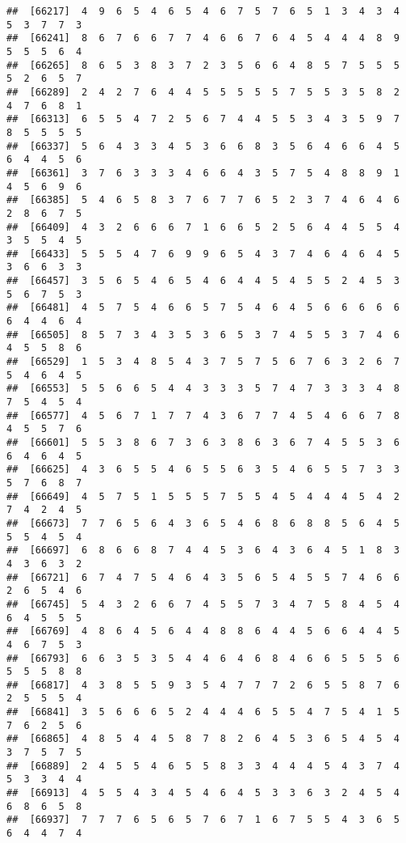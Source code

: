 \documentclass[
]{book}
\begin{document}
\begin{verbatim}
##  [66217]  4  9  6  5  4  6  5  4  6  7  5  7  6  5  1  3  4  3  4  5  3  7  7  3
##  [66241]  8  6  7  6  6  7  7  4  6  6  7  6  4  5  4  4  4  8  9  5  5  5  6  4
##  [66265]  8  6  5  3  8  3  7  2  3  5  6  6  4  8  5  7  5  5  5  5  2  6  5  7
##  [66289]  2  4  2  7  6  4  4  5  5  5  5  5  7  5  5  3  5  8  2  4  7  6  8  1
##  [66313]  6  5  5  4  7  2  5  6  7  4  4  5  5  3  4  3  5  9  7  8  5  5  5  5
##  [66337]  5  6  4  3  3  4  5  3  6  6  8  3  5  6  4  6  6  4  5  6  4  4  5  6
##  [66361]  3  7  6  3  3  3  4  6  6  4  3  5  7  5  4  8  8  9  1  4  5  6  9  6
##  [66385]  5  4  6  5  8  3  7  6  7  7  6  5  2  3  7  4  6  4  6  2  8  6  7  5
##  [66409]  4  3  2  6  6  6  7  1  6  6  5  2  5  6  4  4  5  5  4  3  5  5  4  5
##  [66433]  5  5  5  4  7  6  9  9  6  5  4  3  7  4  6  4  6  4  5  3  6  6  3  3
##  [66457]  3  5  6  5  4  6  5  4  6  4  4  5  4  5  5  2  4  5  3  5  6  7  5  3
##  [66481]  4  5  7  5  4  6  6  5  7  5  4  6  4  5  6  6  6  6  6  6  4  4  6  4
##  [66505]  8  5  7  3  4  3  5  3  6  5  3  7  4  5  5  3  7  4  6  4  5  5  8  6
##  [66529]  1  5  3  4  8  5  4  3  7  5  7  5  6  7  6  3  2  6  7  5  4  6  4  5
##  [66553]  5  5  6  6  5  4  4  3  3  3  5  7  4  7  3  3  3  4  8  7  5  4  5  4
##  [66577]  4  5  6  7  1  7  7  4  3  6  7  7  4  5  4  6  6  7  8  4  5  5  7  6
##  [66601]  5  5  3  8  6  7  3  6  3  8  6  3  6  7  4  5  5  3  6  6  4  6  4  5
##  [66625]  4  3  6  5  5  4  6  5  5  6  3  5  4  6  5  5  7  3  3  5  7  6  8  7
##  [66649]  4  5  7  5  1  5  5  5  7  5  5  4  5  4  4  4  5  4  2  7  4  2  4  5
##  [66673]  7  7  6  5  6  4  3  6  5  4  6  8  6  8  8  5  6  4  5  5  5  4  5  4
##  [66697]  6  8  6  6  8  7  4  4  5  3  6  4  3  6  4  5  1  8  3  4  3  6  3  2
##  [66721]  6  7  4  7  5  4  6  4  3  5  6  5  4  5  5  7  4  6  6  2  6  5  4  6
##  [66745]  5  4  3  2  6  6  7  4  5  5  7  3  4  7  5  8  4  5  4  6  4  5  5  5
##  [66769]  4  8  6  4  5  6  4  4  8  8  6  4  4  5  6  6  4  4  5  4  6  7  5  3
##  [66793]  6  6  3  5  3  5  4  4  6  4  6  8  4  6  6  5  5  5  6  5  5  5  8  8
##  [66817]  4  3  8  5  5  9  3  5  4  7  7  7  2  6  5  5  8  7  6  2  5  5  5  4
##  [66841]  3  5  6  6  6  5  2  4  4  4  6  5  5  4  7  5  4  1  5  7  6  2  5  6
##  [66865]  4  8  5  4  4  5  8  7  8  2  6  4  5  3  6  5  4  5  4  3  7  5  7  5
##  [66889]  2  4  5  5  4  6  5  5  8  3  3  4  4  4  5  4  3  7  4  5  3  3  4  4
##  [66913]  4  5  5  4  3  4  5  4  6  4  5  3  3  6  3  2  4  5  4  6  8  6  5  8
##  [66937]  7  7  7  6  5  6  5  7  6  7  1  6  7  5  5  4  3  6  5  6  4  4  7  4

\end{verbatim}
\end{document}
